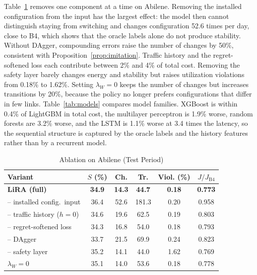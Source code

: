 \documentclass[journal]{IEEEtran}
\begin{document}
Table~\ref{tab:ablation} removes one component at a time on Abilene. Removing the installed configuration from the input has the largest effect: the model then cannot distinguish staying from switching and changes configuration 52.6 times per day, close to B4, which shows that the oracle labels alone do not produce stability. Without DAgger, compounding errors raise the number of changes by 50\%, consistent with Proposition~\ref{prop:imitation}. Traffic history and the regret-softened loss each contribute between 2\% and 4\% of total cost. Removing the safety layer barely changes energy and stability but raises utilization violations from 0.18\% to 1.62\%. Setting $\lambda_W=0$ keeps the number of changes but increases transitions by 20\%, because the policy no longer prefers configurations that differ in few links. Table~\ref{tab:models} compares model families. XGBoost is within 0.4\% of LightGBM in total cost, the multilayer perceptron is 1.9\% worse, random forests are 3.2\% worse, and the LSTM is 1.1\% worse at 3.4 times the latency, so the sequential structure is captured by the oracle labels and the history features rather than by a recurrent model.

\begin{table}[t]
\centering
\caption{Ablation on Abilene (Test Period)}
\label{tab:ablation}
\footnotesize
\setlength{\tabcolsep}{3.5pt}
\begin{tabular}{@{}lccccc@{}}
\toprule
Variant & $S$ (\%) & Ch. & Tr. & Viol. (\%) & $J/J_{\mathrm{B4}}$ \\
\midrule
\textbf{LiRA (full)} & \textbf{34.9} & \textbf{14.3} & \textbf{44.7} & \textbf{0.18} & \textbf{0.773} \\
-- installed config.\ input & 36.4 & 52.6 & 181.3 & 0.20 & 0.958 \\
-- traffic history ($h=0$) & 34.6 & 19.6 & 62.5 & 0.19 & 0.803 \\
-- regret-softened loss & 34.3 & 16.8 & 54.0 & 0.18 & 0.793 \\
-- DAgger & 33.7 & 21.5 & 69.9 & 0.24 & 0.823 \\
-- safety layer & 35.2 & 14.1 & 44.0 & 1.62 & 0.769 \\
$\lambda_W=0$ & 35.1 & 14.0 & 53.6 & 0.18 & 0.778 \\
\bottomrule
\end{tabular}
\end{table}
\end{document}
